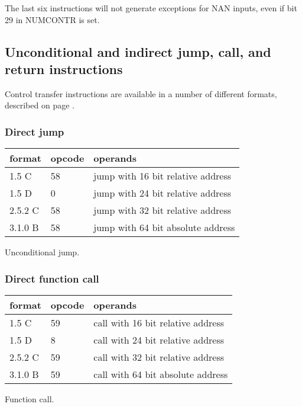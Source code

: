 \documentclass[forwardcom.tex]{subfiles}
\begin{document}
The last six instructions will not generate exceptions for NAN inputs, even if bit 29 in NUMCONTR is set.


\subsection{Unconditional and indirect jump, call, and return instructions}
Control transfer instructions are available in a number of different formats, described on 
page \pageref{table:jumpInstructionFormats}.


\subsubsection{Direct jump}
\label{table:jumpInstruction}
\begin{tabular}{|p{12mm}|p{12mm}|p{110mm}|}
\hline
\bfseries format & \bfseries opcode & \bfseries operands \\ \hline
1.5 C & 58 & jump with 16 bit relative address \\ \hline
1.5 D &  0 & jump with 24 bit relative address \\ \hline
2.5.2 C & 58 & jump with 32 bit relative address \\ \hline
3.1.0 B & 58 & jump with 64 bit absolute address \\ \hline
\end{tabular}
\vspace{2mm}

Unconditional jump.


\subsubsection{Direct function call}
\label{table:callInstruction}
\begin{tabular}{|p{12mm}|p{12mm}|p{110mm}|}
\hline
\bfseries format & \bfseries opcode & \bfseries operands \\ \hline
1.5 C & 59 & call with 16 bit relative address \\ \hline
1.5 D &  8 & call with 24 bit relative address \\ \hline
2.5.2 C & 59 & call with 32 bit relative address \\ \hline
3.1.0 B & 59 & call with 64 bit absolute address \\ \hline
\end{tabular}
\vspace{2mm}

Function call.
\vspace{2mm}
\end{document}
